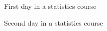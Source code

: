 \documentclass{beamer}\usepackage[]{graphicx}\usepackage[]{color}
\begin{document}
\begin{frame}{First day in a statistics course}
\end{frame}


\begin{frame}{Second day in a statistics course}
\end{frame}
\end{document}
